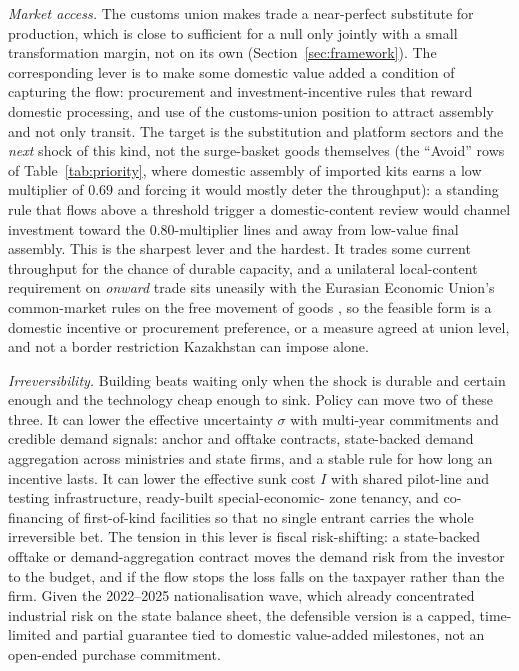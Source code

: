 \documentclass[12pt]{article}
\begin{document}
\emph{Market access.} The customs union makes trade a near-perfect substitute for production,
which is close to sufficient for a null only jointly with a small transformation margin, not
on its own (Section~\ref{sec:framework}). The corresponding lever is to make some
domestic value added a condition of capturing the flow: procurement and investment-incentive
rules that reward domestic processing, and use of the customs-union position to attract
assembly and not only transit. The target is the substitution and platform sectors and the
\emph{next} shock of this kind, not the surge-basket goods themselves (the
``Avoid'' rows of Table~\ref{tab:priority}, where domestic assembly of imported kits earns a
low multiplier of $0.69$ and forcing it would mostly deter the throughput): a standing rule
that flows above a threshold trigger a domestic-content review would channel investment toward
the $0.80$-multiplier lines and away from low-value final assembly. This is the sharpest
lever and the hardest. It trades some current throughput for the chance of
durable capacity, and a unilateral local-content requirement on \emph{onward} trade sits
uneasily with the Eurasian Economic Union's common-market rules on the free movement of goods
\citep{eaeu2014treaty}, so the feasible form is a domestic incentive or procurement
preference, or a measure agreed at union level, and not a border restriction Kazakhstan can
impose alone.

\emph{Irreversibility.} Building beats waiting only when the shock is durable and certain
enough and the technology cheap enough to sink. Policy can move two of these three. It can
lower the effective uncertainty $\sigma$ with multi-year commitments and credible demand
signals: anchor and offtake contracts, state-backed demand aggregation across ministries and
state firms, and a stable rule for how long an incentive lasts. It can lower the effective
sunk cost $I$ with shared pilot-line and testing infrastructure, ready-built special-economic-%
zone tenancy, and co-financing of first-of-kind facilities so that no single entrant carries
the whole irreversible bet. The tension in this lever is fiscal risk-shifting: a state-backed
offtake or demand-aggregation contract moves the demand risk from the investor to the budget,
and if the flow stops the loss falls on the taxpayer rather than the firm. Given the
2022--2025 nationalisation wave, which already concentrated industrial risk on the state
balance sheet, the defensible version is a capped, time-limited and partial guarantee tied to
domestic value-added milestones, not an open-ended purchase commitment.
\end{document}

